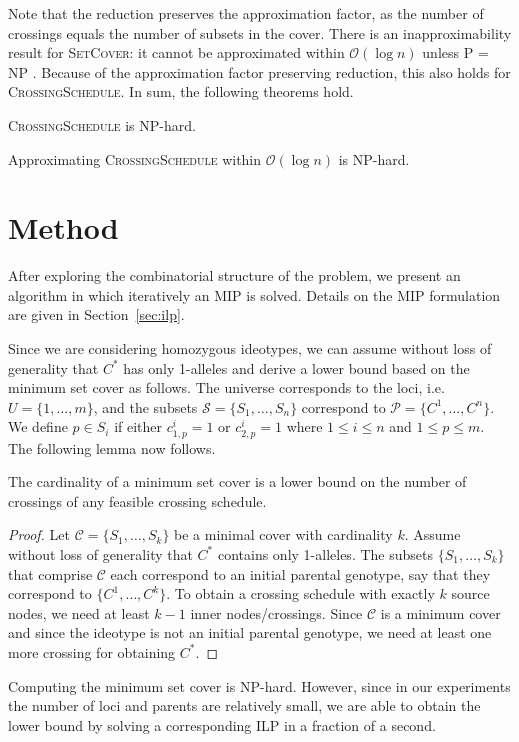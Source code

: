 \documentclass[runningheads]{llncs}
\newcommand{\BigOh}{\ensuremath{\mathcal{O}}}
\begin{document}
Note that the reduction preserves the approximation factor, as the number of crossings equals the number of subsets in the cover. There is an inapproximability result for \textsc{SetCover}: it cannot be approximated within $\BigOh(\log n)$ unless {P = NP} \cite{Raz:1997}. Because of the approximation factor preserving reduction, this also holds for \textsc{CrossingSchedule}. In sum, the following theorems hold.
\begin{theorem}
\textsc{CrossingSchedule} is NP-hard.
\end{theorem}

\begin{theorem}
  Approximating \textsc{CrossingSchedule} within $\BigOh(\log n)$ is NP-hard.
\end{theorem}

\section{Method}\label{sec:method}
After exploring the combinatorial structure of the problem, we present an algorithm in which iteratively an MIP is solved. Details on the MIP formulation are given in Section~\ref{sec:ilp}.

Since we are considering homozygous ideotypes, we can assume without loss of generality that $C^*$ has only 1-alleles and derive a lower bound based on the minimum set cover as follows.
 The universe corresponds to the loci, i.e.\ $U = \{1, \ldots, m\}$, and the subsets $\mathcal{S} = \{S_1, \ldots, S_n\}$ correspond to $\mathcal{P} = \{ C^1, \ldots, C^n \}$. 
We define $p \in S_i$ if either $c^i_{1,p}=1$ or $c^i_{2,p} = 1$ where $1 \leq i \leq n$ and $1 \leq p \leq m$. The following lemma now follows.
\begin{lemma}
\label{lem:lb_crs}
The cardinality of a minimum set cover is a lower bound on the number of crossings of any feasible crossing schedule.
\end{lemma}
\begin{proof}
Let $\mathcal{C} = \{S_1,\ldots,S_k\}$ be a minimal cover with cardinality $k$. Assume without loss of generality that $C^*$ contains only 1-alleles.
The subsets $\{S_1, \ldots, S_k\}$ that comprise $\mathcal{C}$ each correspond to an initial parental genotype, say that they correspond to $\{C^1,\ldots,C^k\}$. To obtain a crossing schedule with exactly $k$ source nodes, we need at least $k-1$ inner nodes/crossings. Since $\mathcal{C}$ is a minimum cover and since the ideotype is not an initial parental genotype, we need at least one more crossing for obtaining $C^*$. 
\end{proof}
Computing the minimum set cover is NP-hard. However, since in our experiments the number of loci and parents are relatively small, we are able to obtain the lower bound by solving a corresponding ILP \cite{Wolsey:1998} in a fraction of a second.
\end{document}
